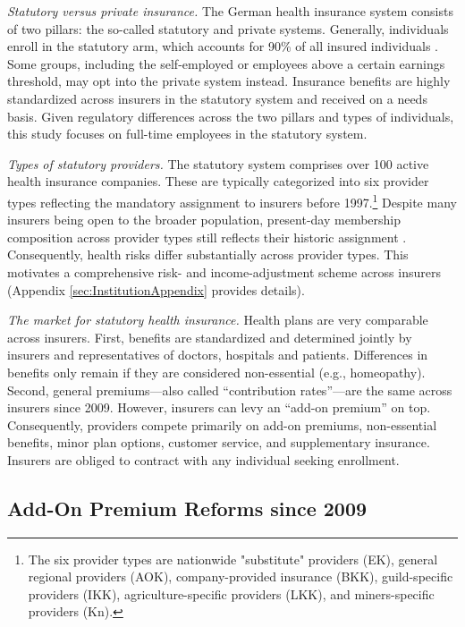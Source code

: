 \documentclass[a4paper, 11pt, english]{article}
\begin{document}
\textit{Statutory versus private insurance.} The German health insurance system consists of two pillars: the so-called statutory and private systems. Generally, individuals enroll in the statutory arm, which accounts for 90\% of all insured individuals \citep{Schmitz2017}. Some groups, including the self-employed or employees above a certain earnings threshold, may opt into the private system instead. Insurance benefits are highly standardized across insurers in the statutory system and received on a needs basis. Given regulatory differences across the two pillars and types of individuals, this study focuses on full-time employees in the statutory system. 

\textit{Types of statutory providers.} The statutory system comprises over 100 active health insurance companies. These are typically categorized into six provider types reflecting the mandatory assignment to insurers before 1997.\footnote{The six provider types are nationwide "substitute" providers (EK), general regional providers (AOK), company-provided insurance (BKK), guild-specific providers (IKK), agriculture-specific providers (LKK), and miners-specific providers (Kn).} Despite many insurers being open to the broader population, present-day membership composition across provider types still reflects their historic assignment \citep{kohlhammer2017}. Consequently, health risks differ substantially across provider types. This motivates a comprehensive risk- and income-adjustment scheme across insurers (Appendix \ref{sec:InstitutionAppendix} provides details).

\textit{The market for statutory health insurance.} Health plans are very comparable across insurers. First, benefits are standardized and determined jointly by insurers and representatives of doctors, hospitals and patients. Differences in benefits only remain if they are considered non-essential (e.g., homeopathy). Second, general premiums---also called ``contribution rates''---are the same across insurers since 2009. However, insurers can levy an ``add-on premium'' on top. Consequently, providers compete primarily on add-on premiums, non-essential benefits, minor plan options, customer service, and supplementary insurance. Insurers are obliged to contract with any individual seeking enrollment.

\subsection{Add-On Premium Reforms since 2009 \label{subsec:reforms}}
\end{document}
